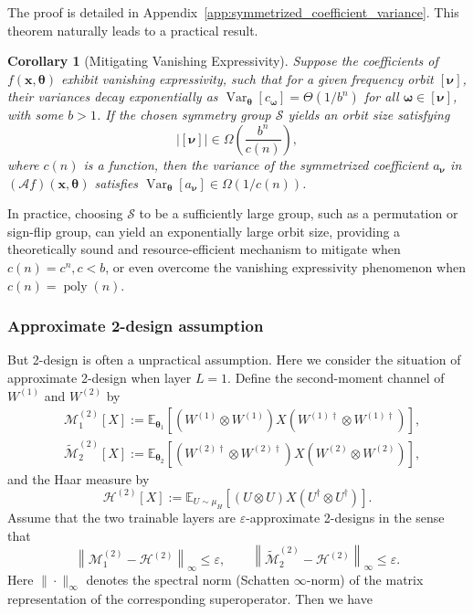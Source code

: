 \documentclass[%
 reprint,
 amsmath,amssymb,
 aps,
 pra,
]{revtex4-2}
\newtheorem{corollary}[theorem]{Corollary}
\theoremstyle{definition}
\begin{document}
The proof is detailed in Appendix~\ref{app:symmetrized_coefficient_variance}. This theorem naturally leads to a practical result. 

\begin{corollary}[Mitigating Vanishing Expressivity]
Suppose the coefficients of \(f(\bm{x}, \bm{\theta})\) exhibit vanishing expressivity, such that for a given frequency orbit \([\bm{\nu}]\), their variances decay exponentially as \(\operatorname{Var}_{\bm{\theta}}[c_{\bm{\omega}}] = \Theta(1/b^{n})\) for all \(\bm{\omega} \in [\bm{\nu}]\), with some \(b>1\). If the chosen symmetry group \(\mathcal{S}\) yields an orbit size satisfying
\begin{equation}
    |[\bm{\nu}]| \in \Omega\left(\frac{b^n}{c(n)}\right),
\end{equation}
where $c(n)$ is a function, then the variance of the symmetrized coefficient \(a_{\bm{\nu}}\) in \((\mathcal{A}f)(\bm{x}, \bm{\theta})\) satisfies \(\operatorname{Var}_{\bm{\theta}}[a_{\bm{\nu}}] \in \Omega(1/c(n))\).
\end{corollary}

In practice, choosing \(\mathcal{S}\) to be a sufficiently large group, such as a permutation or sign-flip group, can yield an exponentially large orbit size, providing a theoretically sound and resource-efficient mechanism to mitigate when $c(n)=c^n,c<b$, or even overcome the vanishing expressivity phenomenon when $c(n)=\operatorname{poly}(n)$.

\subsubsection{Approximate 2-design assumption}

But 2-design is often a unpractical assumption. Here we consider the situation of approximate 2-design when layer $L=1$. Define the second-moment channel of \(W^{(1)}\) and  \(W^{(2)}\) by
\begin{align}
&\mathcal{M}^{(2)}_1[X]
:=
\mathbb{E}_{\bm{\theta}_1}
\left[
(W^{(1)}\otimes W^{(1)})
X
(W^{(1)\dagger}\otimes W^{(1)\dagger})
\right],\\
&\widetilde{\mathcal{M}}^{(2)}_2[X]
:=
\mathbb{E}_{\bm{\theta}_2}
\left[
(W^{(2)\dagger}\otimes W^{(2)\dagger})
X
(W^{(2)}\otimes W^{(2)})
\right],
\end{align}
and the Haar measure by
\begin{equation}
\mathcal{H}^{(2)}[X]
:=
\mathbb{E}_{U\sim\mu_H}
\left[
(U\otimes U)
X
(U^\dagger\otimes U^\dagger)
\right].
\end{equation}
Assume that the two trainable layers are \(\varepsilon\)-approximate 2-designs in the sense that
\begin{equation}
\label{eq:approx_2_design_channel_assumption}
\left\|
\mathcal{M}^{(2)}_1-\mathcal{H}^{(2)}
\right\|_{\infty}
\leq
\varepsilon,
\qquad
\left\|
\widetilde{\mathcal{M}}^{(2)}_2-\mathcal{H}^{(2)}
\right\|_{\infty}
\leq
\varepsilon .
\end{equation}
Here \(\|\cdot\|_{\infty}\) denotes the spectral norm (Schatten $\infty$-norm) of the matrix representation of the corresponding superoperator. Then we have
\end{document}
